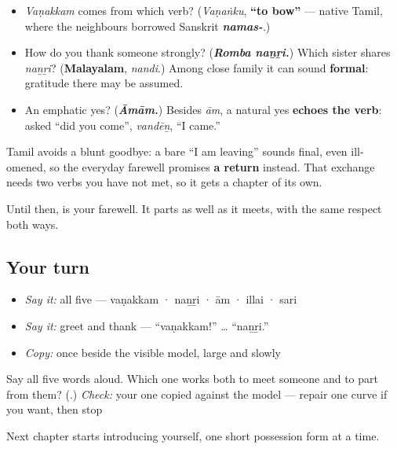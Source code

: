 \begin{itemize}
\raggedright
  \item \emph{Vaṇakkam} comes from which verb? (\emph{Vaṇaṅku}, \textbf{\textquotedblleft{}to bow\textquotedblright{}} — native Tamil, where the neighbours borrowed Sanskrit \emph{\textbf{namas-}}.)
  \item How do you thank someone strongly? (\emph{\textbf{Romba naṉṟi.}}) Which sister shares \emph{naṉṟi}? (\textbf{Malayalam}, \emph{nandi}.) Among close family it can sound \textbf{formal}: gratitude there may be assumed.
  \item An emphatic yes? (\emph{\textbf{Āmām.}}) Besides \emph{ām}, a natural yes \textbf{echoes the verb}: asked \textquotedblleft{}did you come\textquotedblright{}, \emph{vandēṉ}, \textquotedblleft{}I came.\textquotedblright{}
\end{itemize}

\begin{culture}
Tamil avoids a blunt goodbye: a bare \textquotedblleft{}I am leaving\textquotedblright{} sounds final, even ill-omened, so the everyday farewell promises \textbf{a return} instead. That exchange needs two verbs you have not met, so it gets a chapter of its own.

Until then, \textbf{} is your farewell. It parts as well as it meets, with the same respect both ways.
\end{culture}

\subsection*{Your turn}
\begin{itemize}
\raggedright
  \item \emph{Say it:} all five — vaṇakkam · naṉṟi · ām · illai · sari
  \item \emph{Say it:} greet and thank — \textquotedblleft{}vaṇakkam!\textquotedblright{} … \textquotedblleft{}naṉṟi.\textquotedblright{}
  \item \emph{Copy:} \textbf{} once beside the visible model, large and slowly
\end{itemize}

\begin{tcolorbox}[breakable,colback=teal!4,colframe=teal!35!black,title={Before you move on}]
Say all five words aloud. Which one works both to meet someone and to part from them? (\textbf{}.) \emph{Check:} your one copied \textbf{} against the model — repair one curve if you want, then stop

Next chapter starts introducing yourself, one short possession form at a time.
\end{tcolorbox}
